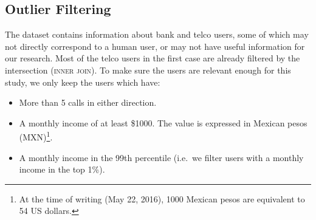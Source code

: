 \subsection{Outlier Filtering}

The dataset contains information about bank and telco users, some of which may not directly correspond to a human user, %
or may not have useful information for our research.
Most of the telco users in the first case are already filtered by the intersection (\textsc{inner join}). To make sure the users are relevant enough for this study, we only keep the users which have:

\begin{itemize}
	\item More than 5 calls in either direction.
	\item A monthly income of at least \$\num{1000}.
	The value is expressed in Mexican pesos (MXN)\footnote{At the time of writing (May 22, 2016), 1000 Mexican pesos are equivalent to 54 US dollars.}.
	\item A monthly income in the \num{99}th percentile (i.e.\ we filter users with a monthly income in the top 1\%).
\end{itemize}
